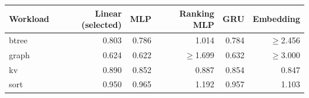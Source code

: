\begin{tabular}{@{}lrrrrr@{}}
\toprule
\textbf{Workload} & \textbf{Linear} (selected) & \textbf{MLP} & \textbf{Ranking MLP} & \textbf{GRU} & \textbf{Embedding} \\
\midrule
btree & 0.803 & 0.786 & 1.014 & 0.784 & $\geq$2.456 \\
graph & 0.624 & 0.622 & $\geq$1.699 & 0.632 & $\geq$3.000 \\
kv & 0.890 & 0.852 & 0.887 & 0.854 & 0.847 \\
sort & 0.950 & 0.965 & 1.192 & 0.957 & 1.103 \\
\bottomrule
\end{tabular}
